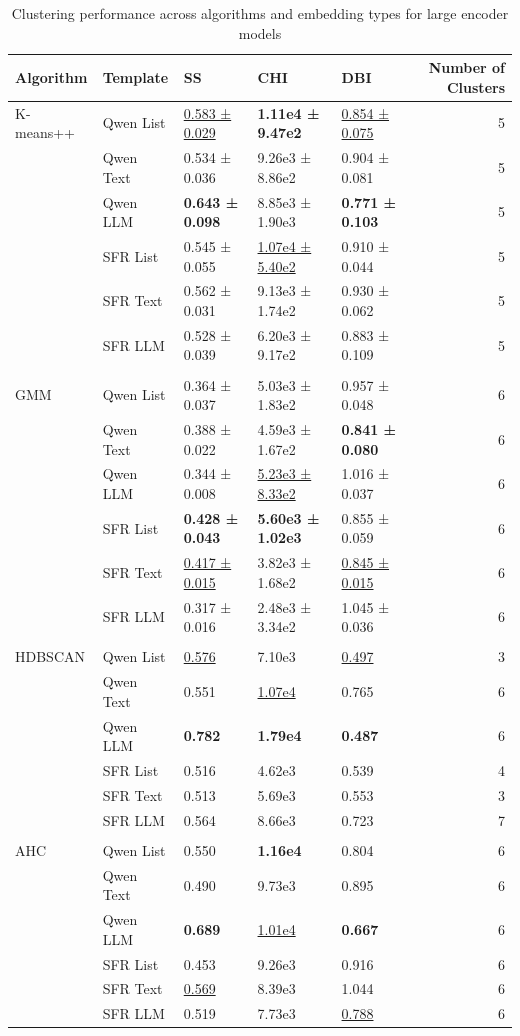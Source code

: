 \begin{table}[!h]
\centering
\caption{Clustering performance across algorithms and embedding types for large encoder models}
\centering
\begin{tabular}[t]{lllllr}
\toprule
Algorithm & Template & SS & CHI & DBI & Number of Clusters\\
\midrule
K-means++ & Qwen List & \underline{0.583 ± 0.029} & \textbf{1.11e4 ± 9.47e2} & \underline{0.854 ± 0.075} & 5\\
 & Qwen Text & 0.534 ± 0.036 & 9.26e3 ± 8.86e2 & 0.904 ± 0.081 & 5\\
 & Qwen LLM & \textbf{0.643 ± 0.098} & 8.85e3 ± 1.90e3 & \textbf{0.771 ± 0.103} & 5\\
 & SFR List & 0.545 ± 0.055 & \underline{1.07e4 ± 5.40e2} & 0.910 ± 0.044 & 5\\
 & SFR Text & 0.562 ± 0.031 & 9.13e3 ± 1.74e2 & 0.930 ± 0.062 & 5\\
\addlinespace
 & SFR LLM & 0.528 ± 0.039 & 6.20e3 ± 9.17e2 & 0.883 ± 0.109 & 5\\
\midrule\\
GMM & Qwen List & 0.364 ± 0.037 & 5.03e3 ± 1.83e2 & 0.957 ± 0.048 & 6\\
 & Qwen Text & 0.388 ± 0.022 & 4.59e3 ± 1.67e2 & \textbf{0.841 ± 0.080} & 6\\
 & Qwen LLM & 0.344 ± 0.008 & \underline{5.23e3 ± 8.33e2} & 1.016 ± 0.037 & 6\\
 & SFR List & \textbf{0.428 ± 0.043} & \textbf{5.60e3 ± 1.02e3} & 0.855 ± 0.059 & 6\\
\addlinespace
 & SFR Text & \underline{0.417 ± 0.015} & 3.82e3 ± 1.68e2 & \underline{0.845 ± 0.015} & 6\\
 & SFR LLM & 0.317 ± 0.016 & 2.48e3 ± 3.34e2 & 1.045 ± 0.036 & 6\\
\midrule\\
HDBSCAN & Qwen List & \underline{0.576} & 7.10e3 & \underline{0.497} & 3\\
 & Qwen Text & 0.551 & \underline{1.07e4} & 0.765 & 6\\
 & Qwen LLM & \textbf{0.782} & \textbf{1.79e4} & \textbf{0.487} & 6\\
\addlinespace
 & SFR List & 0.516 & 4.62e3 & 0.539 & 4\\
 & SFR Text & 0.513 & 5.69e3 & 0.553 & 3\\
 & SFR LLM & 0.564 & 8.66e3 & 0.723 & 7\\
\midrule\\
AHC & Qwen List & 0.550 & \textbf{1.16e4} & 0.804 & 6\\
 & Qwen Text & 0.490 & 9.73e3 & 0.895 & 6\\
\addlinespace
 & Qwen LLM & \textbf{0.689} & \underline{1.01e4} & \textbf{0.667} & 6\\
 & SFR List & 0.453 & 9.26e3 & 0.916 & 6\\
 & SFR Text & \underline{0.569} & 8.39e3 & 1.044 & 6\\
 & SFR LLM & 0.519 & 7.73e3 & \underline{0.788} & 6\\
\midrule
\bottomrule
\end{tabular}
\end{table}
